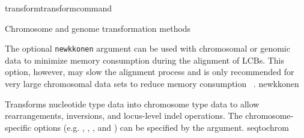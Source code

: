 \begin{command}{transform}{transformcommand}
\begin{arguments}
\begin{argumentgroup}{Chromosome and genome transformation methods}
\begin{description}



                    
                    {The optional \texttt {newkkonen} argument can be used with 
                    chromosomal or genomic data to minimize memory 
                    consumption during the alignment of LCBs.  This option, 
                    however, may slow the alignment process and is only 
                    recommended for very large chromosomal data sets to 
                    reduce memory consumption ~\cite{wheelerhonginprep}.}
                    {newkkonen}
                     
                    {Transforms nucleotide type data into chromosome type data to allow
                    rearrangements, inversions, and locus-level indel operations.  The
                    chromosome-specific options (e.g.  , 
                    , , and 
                    ) can be specified by the argument.}
                    {seqtochrom}
       

\end{description}
\end{argumentgroup}
\end{arguments}
\end{command}

